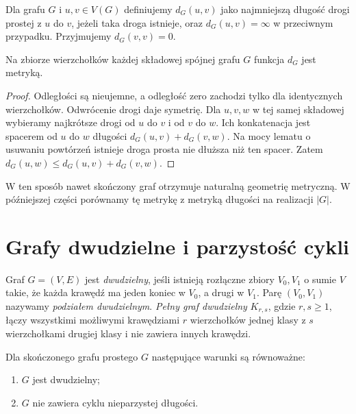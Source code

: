 \begin{definicja}[Odległość]
Dla grafu $G$ i $u,v\in V(G)$ definiujemy
$d_G(u,v)$ jako najmniejszą długość drogi
prostej z $u$ do $v$, jeżeli taka droga istnieje,
oraz $d_G(u,v)=\infty$ w przeciwnym przypadku.
Przyjmujemy $d_G(v,v)=0$.
\end{definicja}

\begin{stwierdzenie}
Na zbiorze wierzchołków każdej składowej spójnej
grafu $G$ funkcja $d_G$ jest metryką.
\end{stwierdzenie}

\begin{proof}
Odległości są nieujemne, a odległość zero zachodzi
tylko dla identycznych wierzchołków. Odwrócenie
drogi daje symetrię. Dla $u,v,w$ w tej samej
składowej wybieramy najkrótsze drogi od $u$ do $v$
i od $v$ do $w$. Ich konkatenacja jest spacerem od
$u$ do $w$ długości $d_G(u,v)+d_G(v,w)$.
Na mocy lematu o usuwaniu powtórzeń istnieje droga
prosta nie dłuższa niż ten spacer. Zatem
$d_G(u,w)\le d_G(u,v)+d_G(v,w)$.
\end{proof}

W ten sposób nawet skończony graf otrzymuje naturalną
geometrię metryczną. W późniejszej części porównamy tę
metrykę z metryką długości na realizacji $|G|$.

\section{Grafy dwudzielne i parzystość cykli}
\label{sec:tg-dwudzielne}

\begin{definicja}
Graf $G=(V,E)$ jest \emph{dwudzielny}, jeśli istnieją
rozłączne zbiory $V_0,V_1$ o sumie $V$ takie, że
każda krawędź ma jeden koniec w $V_0$, a drugi
w $V_1$. Parę $(V_0,V_1)$ nazywamy \emph{podziałem
dwudzielnym}. \emph{Pełny graf dwudzielny} $K_{r,s}$,
gdzie $r,s\ge1$, łączy wszystkimi możliwymi krawędziami
$r$ wierzchołków jednej klasy z $s$ wierzchołkami
drugiej klasy i nie zawiera innych krawędzi.
\end{definicja}

\begin{twierdzenie}
Dla skończonego grafu prostego $G$ następujące
warunki są równoważne:
\begin{enumerate}[label=(\roman*)]
\item $G$ jest dwudzielny;
\item $G$ nie zawiera cyklu nieparzystej długości.
\end{enumerate}
\end{twierdzenie}


